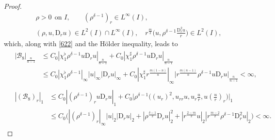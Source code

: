 \documentclass[11pt,reqno]{amsart}
\numberwithin{rk}{section}
\numberwithin{prop}{section}
\numberwithin{mydef}{section}
\numberwithin{lem}{section}
\numberwithin{equation}{section}
\numberwithin{thm}{section}
\begin{document}
\begin{proof}
\begin{equation*}
\begin{aligned}
&\rho>0\ \ \text{on $I$},\qquad (\rho^{\delta-1})_r\in L^\infty(I),\\
&(\rho,u,\mathrm{D}_r u)\in L^2(I)\cap L^\infty(I),\quad 
r^\frac{m}{2}\big(u ,\rho^{\delta-1}\frac{\mathrm{D}_r^2 u}{r}\big)\in L^2(I),
\end{aligned}
\end{equation*}
which, along with \eqref{622} and the H\"older inequality, leads to
\begin{align*}
& \begin{aligned}
|\mathcal{B}_8|_\frac{n}{n-1}&\leq C_0 |\chi_1^\flat \rho^{\delta-1}u\mathrm{D}_r u|_\frac{n}{n-1}+C_0 |\chi_1^\sharp \rho^{\delta-1}u\mathrm{D}_r u|_\frac{n}{n-1}\\ 
&\leq C_0|\chi_1^\flat \rho^{\delta-1}|_\infty |u|_\infty |\mathrm{D}_r u|_\infty +C_0|\chi_1^\sharp r^\frac{m(1-n)}{n}|_\infty \big|r^\frac{m(n-1)}{n}\rho^{\delta-1}u\mathrm{D}_r u\big|_{\frac{n}{n-1}} <\infty,
\end{aligned}\\
&\begin{aligned}
|(\mathcal{B}_8)_r|_1&\leq C_0 |(\rho^{\delta-1})_ru\mathrm{D}_r u|_1+ C_0\Big|\rho^{\delta-1}\big((u_r)^2,u_{rr}u,u_r\frac{u}{r},u(\frac{u}{r})_r\big)\Big|_1\\
&\leq C_0\big(|(\rho^{\delta-1})_r|_\infty|u|_2 |\mathrm{D}_r u|_2+ |\rho^\frac{\delta-1}{2}\mathrm{D}_r u|_2^2+|r^\frac{2-m}{2}u|_2 |r^\frac{m-2}{2}\rho^{\delta-1}\mathrm{D}_r^2 u|_2\big)<\infty.
\end{aligned}
\end{align*}


\end{proof}
\end{document}
